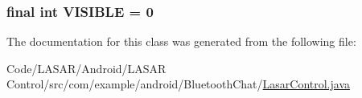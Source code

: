 \hypertarget{classcom_1_1example_1_1android_1_1_bluetooth_chat_1_1_l_a_s_a_r_control_ace98d3d6a968cb69d71e71476d37b8c0}{
\subsubsection[{V\-I\-S\-I\-B\-L\-E}]{\setlength{\rightskip}{0pt plus 5cm}final int {\bf V\-I\-S\-I\-B\-L\-E} = 0}}\label{classcom_1_1example_1_1android_1_1_bluetooth_chat_1_1_l_a_s_a_r_control_ace98d3d6a968cb69d71e71476d37b8c0}


The documentation for this class was generated from the following file\-:\begin{DoxyCompactItemize}
\item 
Code/\-L\-A\-S\-A\-R/\-Android/\-L\-A\-S\-A\-R Control/src/com/example/android/\-Bluetooth\-Chat/\hyperlink{_lasar_control_8java}{Lasar\-Control.\-java}\end{DoxyCompactItemize}
